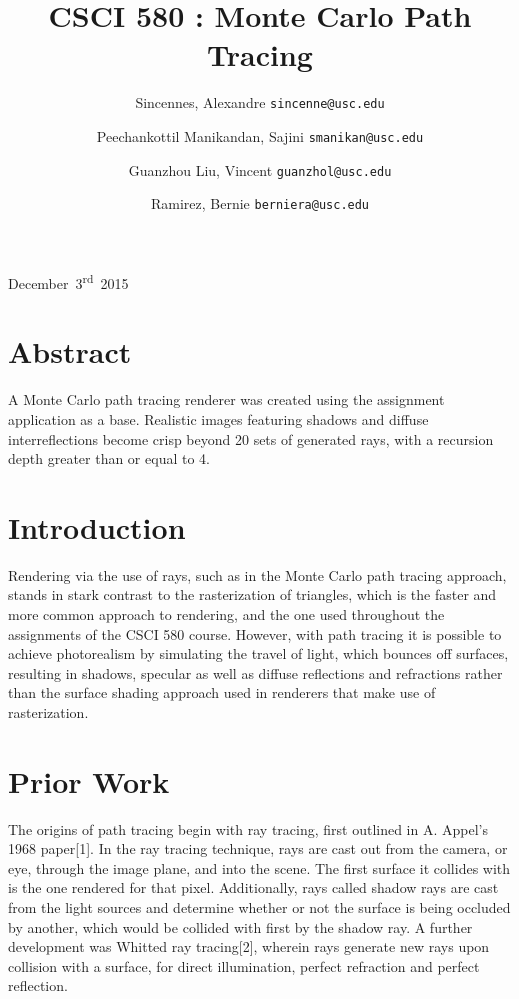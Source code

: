 \documentclass[12pt,journal]{IEEEtran}
\begin{document}
\title{CSCI 580 : Monte Carlo Path Tracing}
{December~3\textsuperscript{rd}~2015}
\author{
	Sincennes, Alexandre
	\texttt{sincenne@usc.edu}\\
	\and
 	Peechankottil Manikandan, Sajini
 	\texttt{smanikan@usc.edu}\\
  	\and
	Guanzhou Liu, Vincent
 	\texttt{guanzhol@usc.edu}\\
  	\and
	Ramirez, Bernie
 	\texttt{berniera@usc.edu}\\
  
}
\maketitle


\section{Abstract}
A Monte Carlo path tracing renderer was created using the assignment application as a base. Realistic images featuring shadows and diffuse interreflections become crisp beyond 20 sets of generated rays, with a recursion depth greater than or equal to 4.


\section{Introduction}
Rendering via the use of rays, such as in the Monte Carlo path tracing approach, stands in stark contrast to the rasterization of triangles, which is the faster and more common approach to rendering, and the one used throughout the assignments of the CSCI 580 course. However, with path tracing it is possible to achieve photorealism by simulating the travel of light, which bounces off surfaces, resulting in shadows, specular as well as diffuse reflections and refractions rather than the surface shading approach used in renderers that make use of rasterization.


\section{Prior Work}
The origins of path tracing begin with ray tracing, first outlined in A. Appel's 1968 paper[1]. In the ray tracing technique, rays are cast out from the camera, or eye, through the image plane, and into the scene. The first surface it collides with is the one rendered for that pixel. Additionally, rays called shadow rays are cast from the light sources and determine whether or not the surface is being occluded by another, which would be collided with first by the shadow ray. A further development was Whitted ray tracing[2], wherein rays generate new rays upon collision with a surface, for direct illumination, perfect refraction and perfect reflection.
\end{document}
